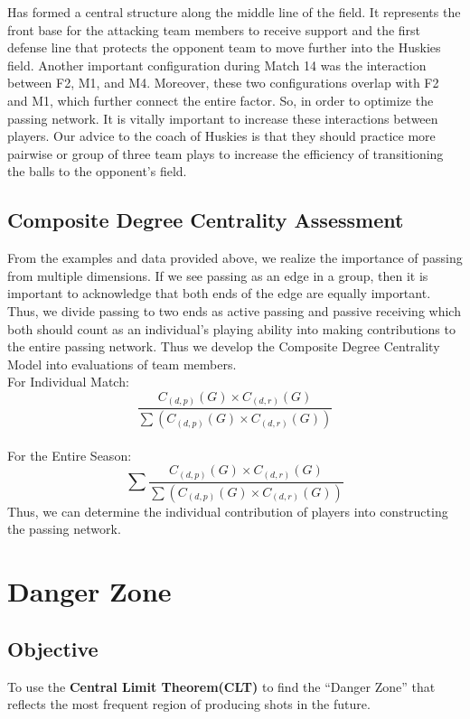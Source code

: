 \documentclass[12pt]{article}
\begin{document}
\newline
Has formed a central structure along the middle line of the field. It represents the front base for the attacking team members to receive support and the first defense line that protects the opponent team to move further into the Huskies field. Another important configuration during Match 14 was the interaction between  F2, M1, and M4. Moreover, these two configurations overlap with F2 and M1, which further connect the entire factor. So, in order to optimize the passing network. It is vitally important to increase these interactions between players. Our advice to the coach of Huskies is that they should practice more pairwise or group of three team plays to increase the efficiency of transitioning the balls to the opponent’s field.

\subsection{Composite Degree Centrality Assessment }
From the examples and data provided above, we realize the importance of passing from multiple dimensions. If we see passing as an edge in a group, then it is important to acknowledge that both ends of the edge are equally important. Thus, we divide passing to two ends as active passing and passive receiving which both should count as an individual’s playing ability into making contributions to the entire passing network. Thus we develop the Composite Degree Centrality Model into evaluations of team members. \\
\newline
For Individual Match:  
\begin{equation*}
\frac{C_{(d,p)}(G) \times C_{(d,r)}(G)}{\sum{( C_{(d,p)}(G)\times C_{(d,r)}(G))}}
\end{equation*}
\\ For the Entire Season:
\begin{equation*}
\sum{\frac{C_{(d,p)}(G) \times C_{(d,r)}(G)}{\sum{( C_{(d,p)}(G)\times C_{(d,r)}(G))}}}
\end{equation*}\newline
Thus, we can determine the individual contribution of players into constructing the passing network. 
\newline
\newpage
\section{Danger Zone}
\subsection{Objective}
To use the \textbf{Central Limit Theorem(CLT)} to find the “Danger Zone” that reflects the most frequent region of producing shots in the future.
\end{document}
